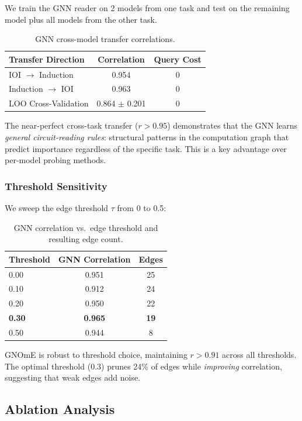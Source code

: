 \documentclass[11pt]{article}
\begin{document}
We train the GNN reader on 2 models from one task and test on the remaining model plus all models from the other task.

\begin{table}[t]
\centering
\caption{GNN cross-model transfer correlations.}
\label{tab:transfer}
\begin{tabular}{lcc}
\toprule
Transfer Direction & Correlation & Query Cost \\
\midrule
IOI $\to$ Induction & 0.954 & 0 \\
Induction $\to$ IOI & 0.963 & 0 \\
LOO Cross-Validation & 0.864 $\pm$ 0.201 & 0 \\
\bottomrule
\end{tabular}
\end{table}

The near-perfect cross-task transfer ($r > 0.95$) demonstrates that the GNN learns \emph{general circuit-reading rules}: structural patterns in the computation graph that predict importance regardless of the specific task. This is a key advantage over per-model probing methods.

\subsubsection{Threshold Sensitivity}

We sweep the edge threshold $\tau$ from 0 to 0.5:

\begin{table}[t]
\centering
\caption{GNN correlation vs.\ edge threshold and resulting edge count.}
\label{tab:threshold}
\begin{tabular}{lcc}
\toprule
Threshold & GNN Correlation & Edges \\
\midrule
0.00 & 0.951 & 25 \\
0.10 & 0.912 & 24 \\
0.20 & 0.950 & 22 \\
\textbf{0.30} & \textbf{0.965} & \textbf{19} \\
0.50 & 0.944 & 8 \\
\bottomrule
\end{tabular}
\end{table}

GNOmE is robust to threshold choice, maintaining $r > 0.91$ across all thresholds. The optimal threshold (0.3) prunes 24\% of edges while \emph{improving} correlation, suggesting that weak edges add noise.

\subsection{Ablation Analysis}
\end{document}
